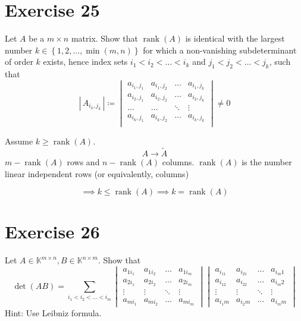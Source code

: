 \documentclass[a4paper]{article}
\theoremstyle{definition}
\newcommand\set[1]{\left\{#1\right\}}
\newcommand\card[1]{\left|\,#1\,\right|}
\DeclareMathOperator\rank{rank}
\begin{document}
\section*{Exercise 25}
\begin{ex}
  Let $A$ be a $m \times n$ matrix. Show that $\rank(A)$ is identical with the largest number $k \in \set{1,2,\ldots,\min(m,n)}$ for which a non-vanishing subdeterminant of order $k$ exists, hence
  index sets $i_1 < i_2 < \ldots < i_k$ and $j_1 < j_2 < \ldots < j_k$, such that
  \[
    \card{A_{i_k,j_k}} \coloneqq
    \begin{vmatrix}
      a_{i_1,j_1} & a_{i_1,j_2} & \ldots & a_{i_1,j_k} \\
      a_{i_2,j_1} & a_{i_2,j_2} & \ldots & a_{i_2,j_k} \\
      \ldots      & \ldots      & \ddots & \vdots      \\
      a_{i_k,j_1} & a_{i_k,j_2} & \ldots & a_{i_k,j_k} \\
    \end{vmatrix}
    \neq 0
  \]
\end{ex}

Assume $k \geq \rank(A)$.
\[ A \to \tilde A \]
$m - \rank(A)$ rows and $n - \rank(A)$ columns.
$\rank(A)$ is the number linear independent rows (or equivalently, columns)

\[ \implies k \leq \rank(A) \implies k = \rank(A) \]

\section*{Exercise 26}
\begin{ex}
  Let $A \in \mathbb K^{m\times n}, B \in \mathbb K^{n \times m}$. Show that
  \[
    \det(AB) = \sum_{i_1 < i_2 < \ldots < i_m}
    \begin{vmatrix}
      a_{1i_1} & a_{1i_2} & \ldots & a_{1i_m} \\
      a_{2i_1} & a_{2i_2} & \ldots & a_{2i_m} \\
      \vdots & \vdots & \ddots & \vdots \\
      a_{mi_1} & a_{mi_2} & \ldots & a_{mi_m}
    \end{vmatrix}
    \begin{vmatrix}
      a_{i_11} & a_{i_21} & \ldots & a_{i_m1} \\
      a_{i_12} & a_{i_22} & \ldots & a_{i_m2} \\
      \vdots & \vdots & \ddots & \vdots \\
      a_{i_1m} & a_{i_2m} & \ldots & a_{i_mm}
    \end{vmatrix}
  \]
  Hint: Use Leibniz formula.
\end{ex}
\end{document}
